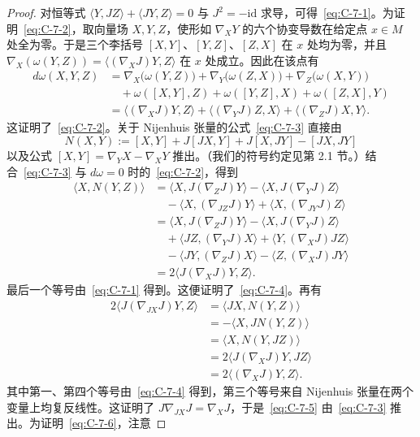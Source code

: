\begin{proof}
对恒等式 $\langle Y,JZ\rangle+\langle JY,Z\rangle=0$ 与 $J^2=-\mathrm{id}$ 求导，可得~\eqref{eq:C-7-1}。为证明~\eqref{eq:C-7-2}，取向量场 $X,Y,Z$，使形如 $\nabla_XY$ 的六个协变导数在给定点 $x\in M$ 处全为零。于是三个李括号 $[X,Y]$、$[Y,Z]$、$[Z,X]$ 在 $x$ 处均为零，并且 $\nabla_X(\omega(Y,Z))=\langle(\nabla_XJ)Y,Z\rangle$ 在 $x$ 处成立。因此在该点有
\begin{align*}
  d\omega(X,Y,Z)
  &=\nabla_X\bigl(\omega(Y,Z)\bigr)+\nabla_Y\bigl(\omega(Z,X)\bigr)
    +\nabla_Z\bigl(\omega(X,Y)\bigr)\\
  &\quad+\omega([X,Y],Z)+\omega([Y,Z],X)+\omega([Z,X],Y)\\
  &=\langle(\nabla_XJ)Y,Z\rangle+\langle(\nabla_YJ)Z,X\rangle
    +\langle(\nabla_ZJ)X,Y\rangle.
\end{align*}
这证明了~\eqref{eq:C-7-2}。关于 Nijenhuis 张量的公式~\eqref{eq:C-7-3} 直接由
\[
  N(X,Y):=[X,Y]+J[JX,Y]+J[X,JY]-[JX,JY]
\]
以及公式 $[X,Y]=\nabla_YX-\nabla_XY$ 推出。（我们的符号约定见第 2.1 节。）结合~\eqref{eq:C-7-3} 与 $d\omega=0$ 时的~\eqref{eq:C-7-2}，得到
\begin{align*}
  \langle X,N(Y,Z)\rangle
  &=\langle X,J(\nabla_ZJ)Y\rangle-\langle X,J(\nabla_YJ)Z\rangle\\
  &\quad-\langle X,(\nabla_{JZ}J)Y\rangle
    +\langle X,(\nabla_{JY}J)Z\rangle\\
  &=\langle X,J(\nabla_ZJ)Y\rangle-\langle X,J(\nabla_YJ)Z\rangle\\
  &\quad+\langle JZ,(\nabla_YJ)X\rangle+\langle Y,(\nabla_XJ)JZ\rangle\\
  &\quad-\langle JY,(\nabla_ZJ)X\rangle-\langle Z,(\nabla_XJ)JY\rangle\\
  &=2\langle J(\nabla_XJ)Y,Z\rangle.
\end{align*}
最后一个等号由~\eqref{eq:C-7-1} 得到。这便证明了~\eqref{eq:C-7-4}。再有
\begin{align*}
  2\langle J(\nabla_{JX}J)Y,Z\rangle
  &=\langle JX,N(Y,Z)\rangle\\
  &=-\langle X,JN(Y,Z)\rangle\\
  &=\langle X,N(Y,JZ)\rangle\\
  &=2\langle J(\nabla_XJ)Y,JZ\rangle\\
  &=2\langle(\nabla_XJ)Y,Z\rangle.
\end{align*}
其中第一、第四个等号由~\eqref{eq:C-7-4} 得到，第三个等号来自 Nijenhuis 张量在两个变量上均复反线性。这证明了 $J\nabla_{JX}J=\nabla_XJ$，于是~\eqref{eq:C-7-5} 由~\eqref{eq:C-7-3} 推出。为证明~\eqref{eq:C-7-6}，注意

\end{proof}
